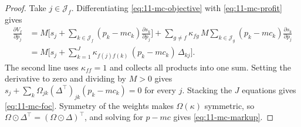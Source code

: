 \begin{proof}
Take $j \in \mathcal{J}_f$. Differentiating \eqref{eq:11-mc-objective} with \eqref{eq:11-mc-profit} gives
\begin{align*}
  \frac{\partial V_f}{\partial p_j}
  &= M\Big[s_j + \sum_{k \in \mathcal{J}_f}(p_k - mc_k)\frac{\partial s_k}{\partial p_j}\Big]
     + \sum_{g \neq f}\kappa_{fg}\, M\sum_{k \in \mathcal{J}_g}(p_k - mc_k)\frac{\partial s_k}{\partial p_j} \\
  &= M\Big[s_j + \sum_{k=1}^{J}\kappa_{f(j)f(k)}\,(p_k - mc_k)\,\Delta_{kj}\Big].
\end{align*}
The second line uses $\kappa_{ff} = 1$ and collects all products into one sum. Setting the derivative to zero and
dividing by $M > 0$ gives $s_j + \sum_k \Omega_{jk}(\Delta^\top)_{jk}(p_k - mc_k) = 0$ for every $j$. Stacking the $J$
equations gives \eqref{eq:11-mc-foc}. Symmetry of the weights makes $\Omega(\kappa)$ symmetric, so
$\Omega \odot \Delta^\top = (\Omega \odot \Delta)^\top$, and solving for $p - mc$ gives \eqref{eq:11-mc-markup}.
\end{proof}

